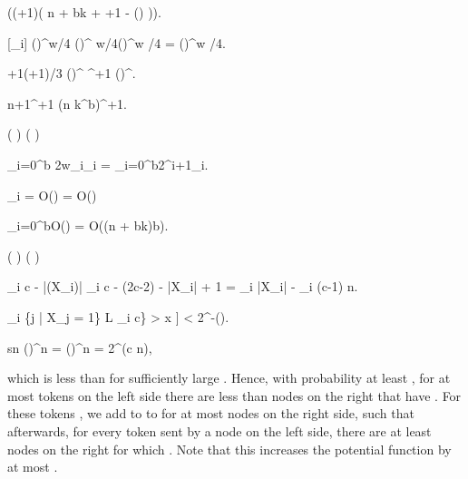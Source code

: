 \documentclass{llncs}
\newcommand{\set}[1]{\left\{#1\right\}}
\renewcommand{\Pr}{\mathbb{P}}
\newcommand{\eps}{\varepsilon}
\begin{document}
\begin{table}[t]
    \exp\left((\ell+1)\cdot\left(
            \ln n + b\ln k + \ell+1 - 
            \ln\left(\frac{w}{\eps}\right)
        \right)\right).
    
    \Pr[_i]  \cdot
    \left(\frac{\eps}{4e b}\right)^{\ell w/4} \leq
    \left(\right)^{\ell
        w/4}\cdot\left(\frac{\eps}{4e b}\right)^{\ell w /4} =
    \left(\frac{\eps}{w}\right)^{\ell w /4}.
    
    \Pr{} \leq 
    {\ell+1\choose (\ell+1)/3}\cdot
    \left(\frac{\eps}{w}\right)^{\cdot {}}
    ^{\ell+1}\cdot
    \left(\frac{\eps}{w}\right)^{\cdot {}}.
    
    {n\choose \ell+1}^{\ell+1} \leq 
    \left(n k^b\right)^{\ell+1}.
    
    \Omega\left(  \right) \geq 
    \Omega\left(  \right)
    
    \sum_{i=0}^{\log b} 2w_i\cdot\ell_i = \sum_{i=0}^{\log b}2^{i+1}\cdot\ell_i.
    
    \ell_i = O\left(\right) =
    O\left(\right)
    
    \sum_{i=0}^{\log b}O\left(\right) = 
    O\big((\log n + b\log k)\log\log b\big).
    
    \Omega\left(  \right) \geq 
    \Omega\left(  \right) 
    
     \sum_i c - |\Gamma(X_i)| \leq 
     \sum_i c - (2c-2) - |X_i| + 1 = \sum_i |X_i| - \sum_i (c-1) \leq
     n. \vspace{-0.5cm}
     
    \Pr\left[ \min \set{|L|\ :\ L\subseteq[\tau]\land 
            \sum_{i \in \{j | X_j = 1\} \cup L} \ell_i \geq
        c} > x \right] < 2^{-\Theta()}.
    
    {s\choose \beta\log n} \leq 
    \left(\right)^{\beta\log n} =
    \left(\right)^{\beta\log n} =
    2^{\Theta(\log c \log n)},
    
    which is less than  for sufficiently large
    . Hence, with probability at least , for
    at most  tokens  on the left side there are less
    than  nodes  on the right that have .  For these  tokens , we add to  to
     for at most  nodes  on the right side,
    such that afterwards, for every token  sent by a node on the
    left side, there are at least  nodes  on the
    right for which . Note that this increases the
    potential function by at most .


\end{table}
\end{document}

